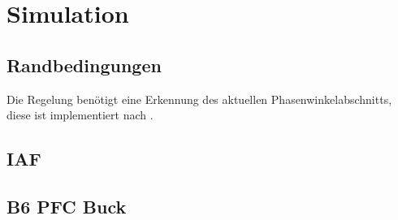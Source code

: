 \chapter{Simulation}

\section{Randbedingungen}

Die Regelung benötigt eine Erkennung des aktuellen Phasenwinkelabschnitts, diese ist implementiert nach \cite{InstituteofElectricalandElectronicsEngineers.2007}.

\section{IAF}



\section{B6 PFC Buck}